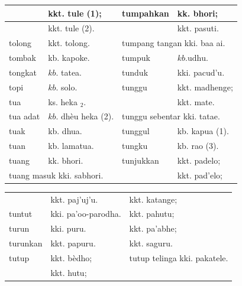 \documentclass[10pt]{article}
\begin{document}
\begin{center}
\begin{tabular}{|l|l|l|l|}
\hline
\multirow{2}{*}{} & kkt. tule (1); & tumpahkan & kk. bhori; \\
\hline
 & kkt. tule (2). &  & kkt. pasuti. \\
\hline
tolong & kkt. tolong. & \multicolumn{2}{|l|}{tumpang tangan kki. baa ai.} \\
\hline
tombak & kb. kapoke. & tumpuk & \(k b . \mathrm{udhu}\). \\
\hline
tongkat & \(k b\). tatea. & tunduk & kki. pacud'u. \\
\hline
topi & \(k b\). solo. & tunggu & kkt. madhenge; \\
\hline
tua & ks. heka \({ }_{2}\). &  & kkt. mate. \\
\hline
tua adat & \(k b\). dhèu heka (2). & \multicolumn{2}{|l|}{tunggu sebentar kki. tatae.} \\
\hline
tuak & kb. dhua. & tunggul & kb. kapua (1). \\
\hline
tuan & kb. lamatua. & tungku & kb. rao (3). \\
\hline
tuang & kk. bhori. & tunjukkan & kkt. padelo; \\
\hline
\multicolumn{2}{|l|}{tuang masuk kki. sabhori.} &  & kkt. pad'elo; \\
\hline
\end{tabular}
\end{center}

\begin{center}
\begin{tabular}{lll}
 & kkt. paj'uj'u. & kkt. katange; \\
tuntut & kki. pa'oo-parodha. & kkt. pahutu; \\
turun & kki. puru. & kkt. pa'abhe; \\
turunkan & kkt. papuru. & kkt. saguru. \\
tutup & kkt. bèdho; & tutup telinga kki. pakatele. \\
 & kkt. hutu; &  \\
\end{tabular}
\end{center}
\end{document}
